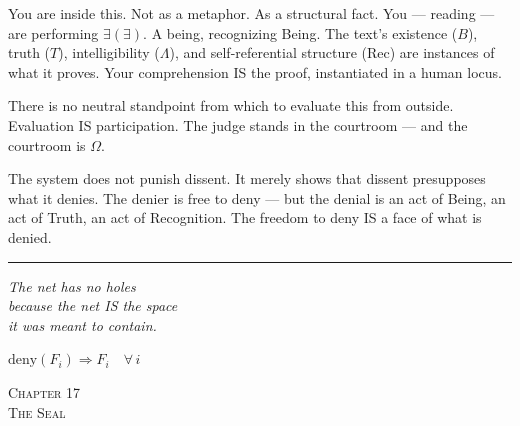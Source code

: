 \documentclass[10pt, openany, oneside]{book}
\renewcommand{\large}{\fontsize{11.5}{14}\selectfont}
\renewcommand{\huge}{\fontsize{17}{21}\selectfont}
\begin{document}
\vspace{1em}

\noindent You are inside this. Not as a metaphor. As a structural fact. You --- reading --- are performing $\exists(\exists)$. A being, recognizing Being. The text's existence ($B$), truth ($T$), intelligibility ($\Lambda$), and self-referential structure (Rec) are instances of what it proves. Your comprehension IS the proof, instantiated in a human locus.

There is no neutral standpoint from which to evaluate this from outside. Evaluation IS participation. The judge stands in the courtroom --- and the courtroom is $\Omega$.

The system does not punish dissent. It merely shows that dissent presupposes what it denies. The denier is free to deny --- but the denial is an act of Being, an act of Truth, an act of Recognition. The freedom to deny IS a face of what is denied.

\vspace{2em}

\begin{center}
    \rule{0.15\textwidth}{0.3pt}
\end{center}

\vspace{0.5em}

\begin{center}
    \itshape
    The net has no holes\\
    because the net IS the space\\
    it was meant to contain.
\end{center}

\vspace{0.5em}

\begin{center}
    $\text{deny}(F_i) \Rightarrow F_i \quad \forall\, i$
\end{center}

%
%
%

\newpage

\begin{center}
    {\huge\scshape Chapter 17}\\[0.3em]
    {\large\scshape The Seal}
\end{center}
\end{document}
